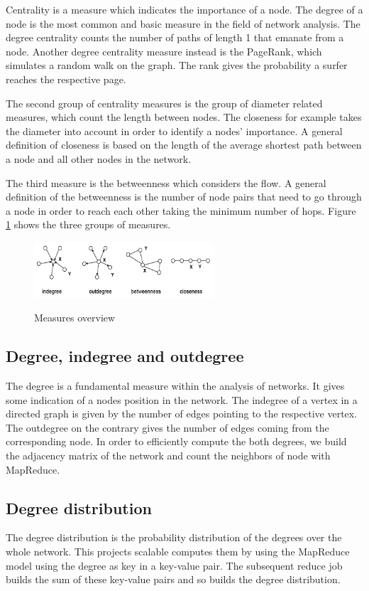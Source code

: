 Centrality is a measure which indicates the importance of a node. The degree of a node is the most common and basic measure in the field of network analysis. The degree centrality counts the number of paths of length 1 that emanate from a node. Another degree centrality measure instead is the PageRank, which simulates a random walk on the graph. The rank gives the probability a surfer reaches the respective page. 

The second group of centrality measures is the group of diameter related measures, which count the length between nodes. The closeness for example takes the diameter into account in order to identify a nodes’ importance. A general definition of closeness is based on the length of the average shortest path between a node and all other nodes in the network. 

The third measure is the betweenness which considers the flow. A general definition of the betweenness is the number of node pairs that need to go through a node in order to reach each other taking the minimum number of hops. Figure \ref{fig1} shows the three groups of measures.

\begin{figure}[h]
	\begin{center}
		\label{fig1}		
		\includegraphics[width=0.6\textwidth]{fig1}	
		\caption{Measures overview}	
	\end{center}
\end{figure}

\subsection{Degree, indegree and outdegree}
The degree is a fundamental measure within the analysis of networks. It gives some indication of a nodes position in the network. The indegree of a vertex in a directed graph is given by the number of edges pointing to the respective vertex. The outdegree on the contrary gives the number of edges coming from the corresponding node. In order to efficiently compute the both degrees, we build the adjacency matrix of the network and count the neighbors of node with MapReduce.

\subsection{Degree distribution}
The degree distribution is the probability distribution of the degrees over the whole network. This projects scalable computes them by using the MapReduce model using the degree as key in a key-value pair. The subsequent reduce job builds the sum of these key-value pairs and so builds the degree distribution.

